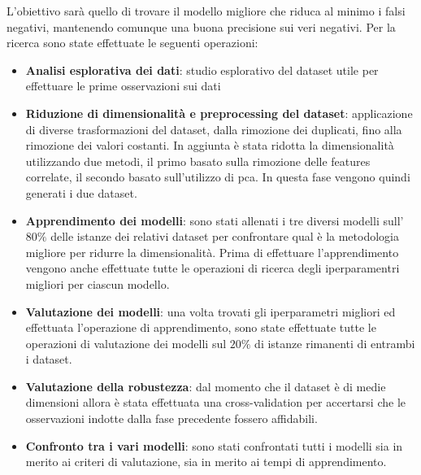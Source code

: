L'obiettivo sarà quello di trovare il modello migliore che riduca al minimo i falsi 
negativi, mantenendo comunque una buona precisione sui veri negativi. Per la ricerca
sono state effettuate le seguenti operazioni:
\begin{itemize}
    \item \textbf{Analisi esplorativa dei dati}: studio esplorativo del dataset
    utile per effettuare le prime osservazioni sui dati
    \item \textbf{Riduzione di dimensionalità e preprocessing del dataset}: 
    applicazione di diverse trasformazioni del dataset, dalla rimozione dei duplicati,
    fino alla rimozione dei valori costanti. In aggiunta è stata ridotta la dimensionalità
    utilizzando due metodi, il primo basato sulla rimozione delle features correlate,
    il secondo basato sull'utilizzo di pca. In questa fase vengono quindi generati 
    i due dataset.
    \item \textbf{Apprendimento dei modelli}: sono stati allenati i tre diversi modelli
    sull'$80\%$ delle istanze dei relativi dataset per confrontare qual è la metodologia 
    migliore per ridurre la dimensionalità. Prima di effettuare l'apprendimento
    vengono anche effettuate tutte le operazioni di ricerca degli iperparamentri 
    migliori per ciascun modello.
    \item \textbf{Valutazione dei modelli}: una volta trovati gli iperparametri
    migliori ed effettuata l'operazione di apprendimento, sono state effettuate
    tutte le operazioni di valutazione dei modelli sul $20\%$ di istanze rimanenti
    di entrambi i dataset.
    \item \textbf{Valutazione della robustezza}: dal momento che il dataset è
    di medie dimensioni allora è stata effettuata una cross-validation per 
    accertarsi che le osservazioni indotte dalla fase precedente fossero affidabili.
    \item \textbf{Confronto tra i vari modelli}: sono stati confrontati tutti
    i modelli sia in merito ai criteri di valutazione, sia in merito ai tempi 
    di apprendimento.
\end{itemize}

